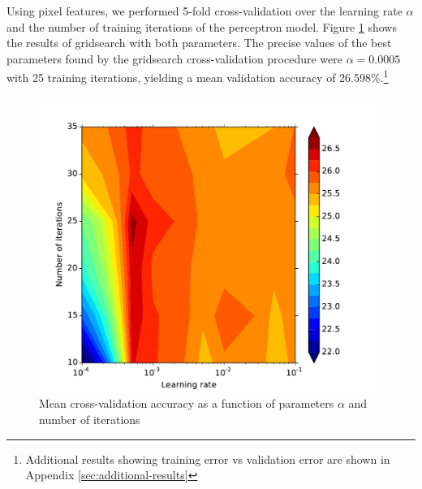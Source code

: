 \documentclass{acm_proc_article-sp}
\begin{document}
Using pixel features, we performed 5-fold cross-validation over the learning rate $\alpha$ and the number of training iterations of the perceptron model. Figure \ref{fig:perc-gridsearch} shows the results of gridsearch with both parameters. The precise values of the best parameters found by the gridsearch cross-validation procedure were $\alpha = 0.0005$ with 25 training iterations, yielding a mean validation accuracy of 26.598\%.\footnote{Additional results showing training error vs validation error are shown in Appendix \ref{sec:additional-results}}
\begin{figure}[h!]
	\centering
	\includegraphics[width=\linewidth]{perceptron_gridsearch}
  	\caption{Mean cross-validation accuracy as a function of parameters $\alpha$ and number of iterations}
  	\label{fig:perc-gridsearch}
\end{figure}
\end{document}
